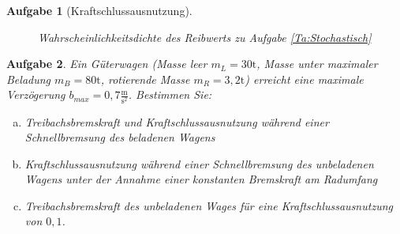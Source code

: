 \documentclass[11pt,a4paper,headsepline]{scrartcl}
\newtheorem{aufgabe}{Aufgabe}
\begin{document}
\begin{aufgabe}[Kraftschlussausnutzung]
\begin{enumerate}[a)]
\begin{figure}[htbp]
\begin{center}
                        \caption{Wahrscheinlichkeitsdichte des Reibwerts zu Aufgabe \ref{Ta:Stochastisch}}
                        \label{Fig:Stochastisch}
                        \end{center}
                    \end{figure}
\end{enumerate}
\end{aufgabe}
\vspace{0.5cm}
\begin{aufgabe}
Ein G\"uterwagen (Masse leer $m_{L} = 30 \mathrm{t}$, Masse unter maximaler Beladung $m_{B} = 80 \mathrm{t}$, rotierende Masse $m_{R} = 3{,}2 \mathrm{t}$) erreicht eine maximale Verz\"ogerung $b_{max} = 0{,}7 \frac{\mathrm{m}}{\mathrm{s}^2}$.
Bestimmen Sie:
\begin{enumerate}[a)]
\item Treibachsbremskraft und Kraftschlussausnutzung w\"ahrend einer Schnellbremsung des beladenen Wagens
\item Kraftschlussausnutzung w\"ahrend einer Schnellbremsung des unbeladenen Wagens unter der Annahme einer konstanten Bremskraft am Radumfang
\item Treibachsbremskraft des unbeladenen Wages f\"ur eine Kraftschlussausnutzung von $0{,1}$.
\end{enumerate}
\end{aufgabe}
\newpage
 
\end{document}
